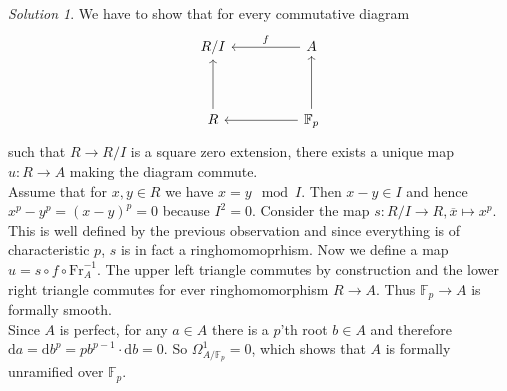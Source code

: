 \documentclass[11pt]{article}
\theoremstyle{definition}
\theoremstyle{remark}
\newtheorem*{solution}{Solution}
\begin{document}
\begin{solution}
We have to show that for every commutative diagram
\[
\begin{tikzcd}[sep=huge]
R/I & A \arrow[l, "f"']\\
R \arrow[u]  & \mathbb{F}_p \arrow[l] \arrow[u]
\end{tikzcd}
\]
such that $R\rightarrow R/I$ is a square zero extension, there exists a unique map $u: R \rightarrow A$ making the diagram commute.\\
Assume that for $x,y \in R$ we have $x = y \mod I$. Then $x-y \in I$ and hence $x^p -y^p = (x-y)^p = 0$ because $I^2=0$.
Consider the map $s : R/I \rightarrow R, \overline{x} \mapsto x^p$. This is well defined by the previous observation and since everything is of characteristic $p$, $s$ is in fact a ringhomomoprhism.
Now we define a map $u=s \circ f \circ \text{Fr}_A^{-1}$. The upper left triangle commutes by construction and the lower right triangle commutes for ever ringhomomorphism $R\rightarrow A$. Thus $\mathbb{F}_p \rightarrow A$ is formally smooth.\\
Since $A$ is perfect, for any $a\in A$ there is a $p$'th root $b\in A$ and therefore $\text{d}a = \text{d}b^p = pb^{p-1}\cdot \text{d}b = 0$. So $\Omega_{A/\mathbb{F}_p}^1 = 0$, which shows that $A$ is formally unramified over $\mathbb{F}_p$.

\end{solution}
\end{document}
